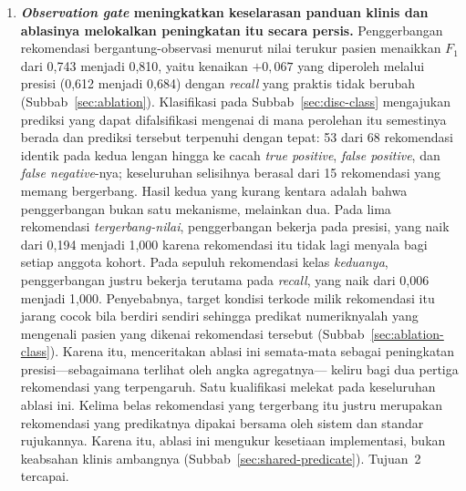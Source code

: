 \begin{enumerate}
    \item \textbf{\emph{Observation gate} meningkatkan keselarasan panduan klinis dan ablasinya
    melokalkan peningkatan itu secara persis.} Penggerbangan rekomendasi bergantung-observasi
    menurut nilai terukur pasien menaikkan $F_1$ dari 0,743 menjadi
    0,810, yaitu kenaikan $+0{,}067$ yang diperoleh melalui presisi
    (0,612 menjadi 0,684) dengan \emph{recall} yang praktis
    tidak berubah (Subbab~\ref{sec:ablation}). Klasifikasi pada
    Subbab~\ref{sec:disc-class} mengajukan prediksi yang dapat difalsifikasi mengenai di mana
    perolehan itu semestinya berada dan prediksi tersebut terpenuhi dengan tepat: 53 dari 68
    rekomendasi identik pada kedua lengan hingga ke cacah \emph{true positive}, \emph{false
    positive}, dan \emph{false negative}-nya; keseluruhan selisihnya berasal dari 15
    rekomendasi yang memang bergerbang. Hasil kedua yang kurang kentara adalah bahwa
    penggerbangan bukan satu mekanisme, melainkan dua. Pada lima rekomendasi \emph{tergerbang-nilai}, penggerbangan bekerja pada presisi, yang naik
    dari 0,194 menjadi 1,000 karena rekomendasi itu tidak lagi menyala bagi setiap anggota
    kohort. Pada sepuluh rekomendasi kelas \emph{keduanya}, penggerbangan justru bekerja
    terutama pada \emph{recall}, yang naik dari 0,006 menjadi 1,000. Penyebabnya, target
    kondisi terkode milik rekomendasi itu jarang cocok bila berdiri sendiri sehingga
    predikat numeriknyalah yang mengenali pasien yang dikenai rekomendasi tersebut
    (Subbab~\ref{sec:ablation-class}). Karena itu, menceritakan ablasi ini
    semata-mata sebagai peningkatan presisi---sebagaimana terlihat oleh angka agregatnya---
    keliru bagi dua pertiga rekomendasi yang terpengaruh. Satu kualifikasi melekat pada keseluruhan ablasi ini. Kelima belas rekomendasi yang
    tergerbang itu justru merupakan rekomendasi yang predikatnya dipakai bersama oleh sistem
    dan standar rujukannya. Karena itu, ablasi ini mengukur kesetiaan implementasi, bukan
    keabsahan klinis ambangnya (Subbab~\ref{sec:shared-predicate}). Tujuan~2 tercapai.


\end{enumerate}

